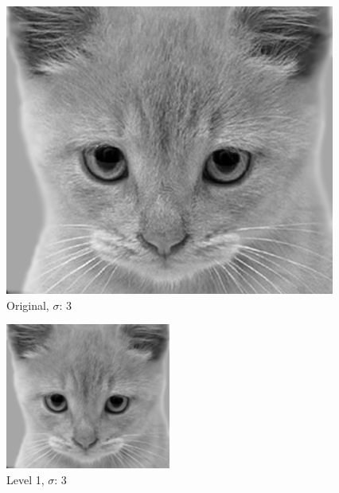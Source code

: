 \documentclass{article}
\begin{document}
\begin{minipage}{\linewidth}
    \centering
    \begin{minipage}{0.45\linewidth}
        \begin{figure}[H]
			\includegraphics[width=\linewidth]{Ejercicio2d/cat0.png}          
			\caption{Original, $\sigma$: 3}
        \end{figure}
    \end{minipage}
    \hspace{0.05\linewidth}
    \begin{minipage}{0.45\linewidth}
        \begin{figure}[H]
            \includegraphics[width=\linewidth]{Ejercicio2d/cat1.png}          
			\caption{Level 1, $\sigma$: 3}
        \end{figure}
    \end{minipage}
    

\end{minipage}
\end{document}
